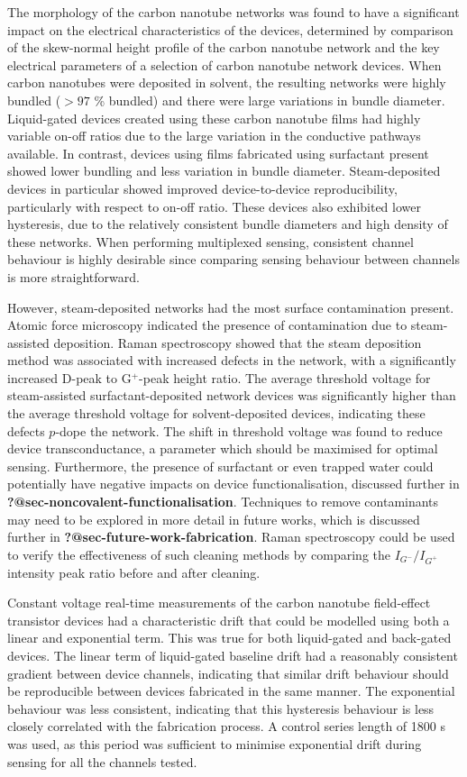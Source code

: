 \documentclass[
  a4paper,
]{scrbook}
\begin{document}
The morphology of the carbon nanotube networks was found to have a
significant impact on the electrical characteristics of the devices,
determined by comparison of the skew-normal height profile of the carbon
nanotube network and the key electrical parameters of a selection of
carbon nanotube network devices. When carbon nanotubes were deposited in
solvent, the resulting networks were highly bundled (\(>97\) \% bundled)
and there were large variations in bundle diameter. Liquid-gated devices
created using these carbon nanotube films had highly variable on-off
ratios due to the large variation in the conductive pathways available.
In contrast, devices using films fabricated using surfactant present
showed lower bundling and less variation in bundle diameter.
Steam-deposited devices in particular showed improved device-to-device
reproducibility, particularly with respect to on-off ratio. These
devices also exhibited lower hysteresis, due to the relatively
consistent bundle diameters and high density of these networks. When
performing multiplexed sensing, consistent channel behaviour is highly
desirable since comparing sensing behaviour between channels is more
straightforward.

However, steam-deposited networks had the most surface contamination
present. Atomic force microscopy indicated the presence of contamination
due to steam-assisted deposition. Raman spectroscopy showed that the
steam deposition method was associated with increased defects in the
network, with a significantly increased D-peak to G\(^+\)-peak height
ratio. The average threshold voltage for steam-assisted
surfactant-deposited network devices was significantly higher than the
average threshold voltage for solvent-deposited devices, indicating
these defects \(p\)-dope the network. The shift in threshold voltage was
found to reduce device transconductance, a parameter which should be
maximised for optimal sensing. Furthermore, the presence of surfactant
or even trapped water could potentially have negative impacts on device
functionalisation, discussed further in
\textbf{?@sec-noncovalent-functionalisation}. Techniques to remove
contaminants may need to be explored in more detail in future works,
which is discussed further in \textbf{?@sec-future-work-fabrication}.
Raman spectroscopy could be used to verify the effectiveness of such
cleaning methods by comparing the \(I_{G^-}/I_{G^+}\) intensity peak
ratio before and after cleaning.

Constant voltage real-time measurements of the carbon nanotube
field-effect transistor devices had a characteristic drift that could be
modelled using both a linear and exponential term. This was true for
both liquid-gated and back-gated devices. The linear term of
liquid-gated baseline drift had a reasonably consistent gradient between
device channels, indicating that similar drift behaviour should be
reproducible between devices fabricated in the same manner. The
exponential behaviour was less consistent, indicating that this
hysteresis behaviour is less closely correlated with the fabrication
process. A control series length of 1800 s was used, as this period was
sufficient to minimise exponential drift during sensing for all the
channels tested.
\end{document}

